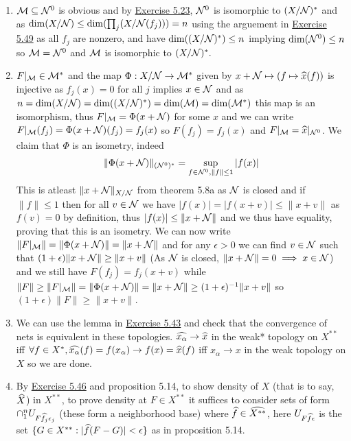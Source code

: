 \documentclass[12pt,a4paper]{article}
\begin{document}
\begin{solution}
    \begin{enumerate}[label=\alph*.]
        \item $\mathcal{M} \subseteq\mathcal{N}^0$ is obvious and by \hyperref[prob:5-23]{Exercise 5.23}, $\mathcal{N}^0$ is isomorphic to $(X/\mathcal{N})^*$ and as $\dim(X/\mathcal{N})\leq\dim(\prod_j(X/\mathcal{N}(f_j)))=n$ using the arguement in \hyperref[prob:5-49]{Exercise 5.49} as all $f_j$ are nonzero, and  have $\dim((X/\mathcal{N})^*)\leq n$ implying $\dim(\mathcal{N}^0)\leq n$ so $\mathcal{M}=\mathcal{N}^0$ and $\mathcal{M}$ is isomorphic to $(X/\mathcal{N})^*.$ 
        \item $F|_{\mathcal{M}}\in\mathcal{M}^*$ and the map $\Phi:X/\mathcal{N}\to\mathcal{M}^*$ given by $x+\mathcal{N}\mapsto(f\mapsto\widehat{x}(f))$ is injective as $f_j(x)=0$ for all $j$ implies $x\in\mathcal{N}$ and as $n=\dim(X/\mathcal{N})=\dim((X/\mathcal{N})^*)=\dim(\mathcal{M})=\dim(\mathcal{M}^*)$ this map is an isomorphism, thus $F|_{\mathcal{M}}=\Phi(x+\mathcal{N})$ for some $x$ and we can write $F|_{\mathcal{M}}(f_j)=\Phi(x+\mathcal{N})(f_j)=f_j(x)$ so $F(f_j)=f_j(x)$ and $F|_{\mathcal{M}}=\widehat{x}|_{\mathcal{N}^0}$. 
            We claim that $\Phi$ is an isometry, indeed 
            \[
                \|\Phi(x+\mathcal{N})\|_{(\mathcal{N}^0)^*}=\sup_{f\in\mathcal{N}^0,\|f\|\leq 1}|f(x)|
            \]
            This is atleast $\|x+\mathcal{N}\|_{X/\mathcal{N}}$ from theorem 5.8a as $\mathcal{N}$ is closed and if $\|f\|\leq 1$ then for all $v\in\mathcal{N}$ we have $|f(x)|=|f(x+v)|\leq\|x+v\|$ as $f(v)=0$ by definition, thus $|f(x)|\leq\|x+\mathcal{N}\|$ and we thus have equality, proving that this is an isometry. 
            We can now write $\|F|_{\mathcal{M}}\|=\|\Phi(x+\mathcal{N})\|=\|x+\mathcal{N}\|$ and for any $\epsilon>0$ we can find $v\in\mathcal{N}$ such that $(1+\epsilon)\|x+\mathcal{N}\|\geq\|x+v\|$ (As $\mathcal{N}$ is closed, $\|x+\mathcal{N}\|=0\implies x\in\mathcal{N}$) and we still have $F(f_j)=f_j(x+v)$ while $\|F\|\geq\|F|_{\mathcal{M}}\|=\|\Phi(x+\mathcal{N})\|=\|x+\mathcal{N}\|\geq(1+\epsilon)^{-1}\|x+v\|$ so $(1+\epsilon)\|F\|\geq\|x+v\|$. 
        \item We can use the lemma in \hyperref[prob:5-43]{Exercise 5.43} and check that the convergence of nets is equivalent in these topologies. 
            $\widehat{x_\alpha}\to\widehat{x}$ in the weak* topology on $X^{**}$ iff $\forall f\in X^*,\widehat{x_\alpha}(f)=f(x_\alpha)\to f(x)=\widehat{x}(f)$ iff $x_\alpha\to x$ in the weak topology on $X$ so we are done. 
        \item By \hyperref[prob:5-46]{Exercise 5.46} and proposition 5.14, to show density of $X$ (that is to say, $\widehat{X}$) in $X^{**}$, to prove density at $F\in X^{**}$ it suffices to consider sets of form $\cap_1^nU_{F\widehat{f_j}\epsilon_j}$ (these form a neighborhood base) where $\widehat{f}\in\widehat{X^{**}}$, here $U_{F\widehat{f}\epsilon}$ is the set $\{G\in X^{**}:|\widehat{f}(F-G)|<\epsilon\}$ as in proposition 5.14. 

\end{enumerate}
\end{solution}
\end{document}
